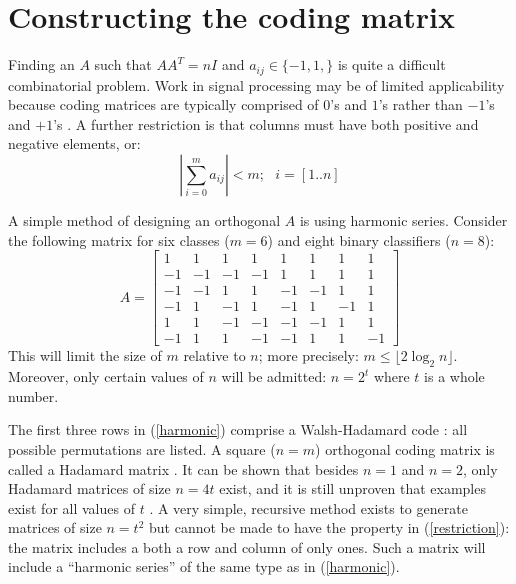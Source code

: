 \section{Constructing the coding matrix}

\label{construction}

Finding an $A$ such that $A A^T = n I$ and $a_{ij} \in \lbrace -1, 1, \rbrace$
is quite a difficult combinatorial problem.
Work in signal processing may be of limited applicability because coding
matrices are typically comprised of $0$'s and $1$'s 
rather than $-1$'s and $+1$'s \citep{Hedayat_etal1999,Panse_etal2014}.
A further restriction is that
columns must have both positive and negative elements, or:
\begin{equation}
	\left | \sum_{i=0}^m a_{ij} \right | < m;  ~~~ i=[1..n] \label{restriction}
\end{equation}

A simple method of designing an orthogonal $A$ is using harmonic series.
Consider the following matrix for six classes ($m=6$) 
and eight binary classifiers ($n=8$):
\begin{equation}
	A = \left [ \begin{array}{rrrrrrrr}
			 1 & 1 & 1 & 1 & 1 & 1 & 1 & 1 \\
			-1 & -1 & -1 & -1 & 1 & 1 & 1 & 1 \\
			-1 & -1 & 1 & 1 & -1 & -1 & 1 & 1 \\
			-1 & 1 & -1 & 1 & -1 & 1 & -1 & 1 \\
			 1 &  1 & -1 & -1 & -1 & -1 & 1 & 1 \\
			-1 & 1 & 1 & -1 & -1 & 1 & 1 & -1 
	\end{array} \right ]
	\label{harmonic}
\end{equation}
This will limit the size of $m$ relative to $n$; more precisely:
$m \le \lfloor 2 \log_2 n \rfloor$. Moreover, only certain values of $n$
will be admitted: $n=2^t$ where $t$ is a whole number.

The first three rows in (\ref{harmonic}) comprise a Walsh-Hadamard code \citep{Arora_Barak2009}:
all possible permutations are listed.
A square ($n=m$) orthogonal coding matrix is called a Hadamard matrix
\citep{Sylvester1867}.
It can be shown that besides $n=1$ and $n=2$, only Hadamard matrices of size
$n=4t$ exist,  
and it is still unproven that examples exist for all values of $t$
\citep{Hedayat_Wallis1978}.
A very simple, recursive method exists to generate matrices of size $n=t^2$ 
\citep{Hedayat_Wallis1978} but cannot be made to have the property in (\ref{restriction}): 
the matrix includes a both a row and column of only ones.
Such a matrix will include a ``harmonic series'' of the same type as in
(\ref{harmonic}).

